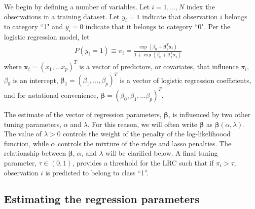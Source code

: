 \documentclass{article}
\begin{document}
We begin by defining a
number of variables.  Let $i = 1,\ldots,N$ index the observations in a training dataset. 
Let $y_i = 1$ indicate that observation $i$ belongs to category ``1" and $y_i = 0$ indicate
that it belongs to category ``0".  Per the logistic regression model, let  
\begin{align}
P(y_i = 1) \equiv \pi_i = 
\frac{\exp(\beta_0 + \boldsymbol{\beta}_1^T \mathbf{x}_i)}{1+\exp(\beta_0 + \boldsymbol{\beta}_1^T \mathbf{x}_i)}
\end{align}
\noindent where $\mathbf{x}_i = (x_1, \ldots x_p)^T$ is a vector of predictors, or covariates, that
influence $\pi_i$, $\beta_0$ is an intercept, $\boldsymbol{\beta}_1 = (\beta_1, \ldots, \beta_p)^T$ is a 
vector of logistic regression coefficients, and for notational convenience, 
$\boldsymbol{\beta} = (\beta_0, \beta_1, \ldots \beta_p)^T$. 

The estimate of the vector of regression parameters, $\boldsymbol{\beta}$, is influenced by two other tuning parameters, 
$\alpha$ and $\lambda$.  For this reason, we will often write $\boldsymbol\beta$ as $\boldsymbol\beta(\alpha,\lambda)$.  
The value of $\lambda > 0$ controls the weight of the
penalty of the log-likelihoood function, while $\alpha$ controls the mixture of the ridge and lasso penalties.  
The relationship between $\boldsymbol{\beta}$, $\alpha$, and $\lambda$ will be clarified below.  A final tuning parameter, 
$\tau \in (0, 1)$, provides a threshold for the LRC such that if $\pi_i > \tau$, observation $i$ is predicted to belong
to class ``1''.

\subsection{Estimating the regression parameters}
\end{document}
